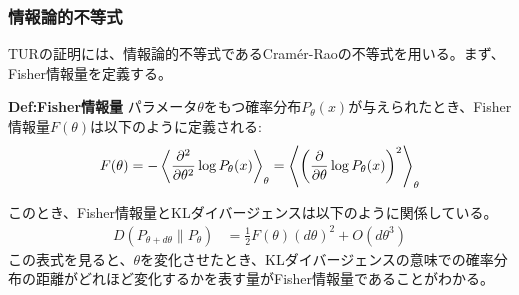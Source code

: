 \documentclass[a4paper,11pt]{jsarticle}
\numberwithin{equation}{section}
\begin{document}
\subsubsection{情報論的不等式}
TURの証明には、情報論的不等式であるCram\'er-Raoの不等式を用いる。まず、Fisher情報量を定義する。
\begin{itembox}[l]{\textbf{Def:Fisher情報量}}
    パラメータ$\theta$をもつ確率分布$P_{\theta}(x)$が与えられたとき、Fisher情報量$F(\theta)$は以下のように定義される:
    \begin{align}
        F(\theta) = -\ev{\pdv[2]{\theta} \log P_{\theta}(x)}_{\theta} =\ev{\qty(\pdv{\theta} \log P_{\theta}(x))^2}_{\theta}
    \end{align}
\end{itembox}
このとき、Fisher情報量とKLダイバージェンスは以下のように関係している。
\begin{align}
    D(P_{\theta + d\theta} \| P_{\theta})
    &= \frac{1}{2} F(\theta) (d\theta)^2 + O(d\theta^3)
\end{align}
この表式を見ると、$\theta$を変化させたとき、KLダイバージェンスの意味での確率分布の距離がどれほど変化するかを表す量がFisher情報量であることがわかる。\\
\end{document}
